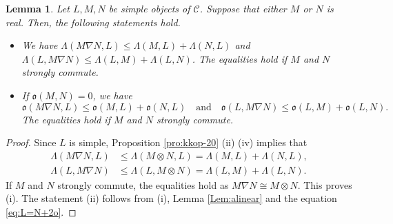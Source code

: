\documentclass[12pt]{amsart}
\newtheorem{lemma}[theorem]{Lemma}
\theoremstyle{definition}
\theoremstyle{remark}
\numberwithin{equation}{section}
\begin{document}
\begin{lemma} \label{Lem:oconv}
Let $L,M,N$ be simple objects of $\mathscr{C}$.
Suppose that either $M$ or $N$ is real. Then, the following statements hold.
\begin{itemize}
    \item [(i)] We have $ \Lambda(M \nabla N, L) \leq  \Lambda(M,L) + \Lambda(N,L)$ and $ \Lambda(L,M\nabla N)\leq   
    \Lambda(L,M) + \Lambda(L,N)$. The equalities hold if $M$ and $N$ strongly commute.
    \item[(ii)] If $\mathfrak{o}(M,N)=0$, we have
\[ \mathfrak{o}(M \nabla N, L) \le \mathfrak{o}(M,L) + \mathfrak{o}(N,L)\quad\text{and}\quad
\mathfrak{o}(L,M\nabla N) \le \mathfrak{o}(L,M) + \mathfrak{o}(L,N).\]
The equalities hold if $M$ and $N$ strongly commute. 
\end{itemize}
\end{lemma}
\begin{proof}
Since $L$ is simple, Proposition \ref{pro:kkop-20} (ii) (iv) implies that 
\begin{align}
    \Lambda(M \nabla N, L) &\leq \Lambda(M \otimes N, L)=  \Lambda(M,L) + \Lambda(N,L),\nonumber\\
    \Lambda(L,M\nabla N)&\leq   \Lambda(L,M\otimes N) =
    \Lambda(L,M) + \Lambda(L,N).\nonumber
\end{align}
If $M$ and $N$ strongly commute, the equalities hold as $M\nabla N\cong M\otimes N$. This proves (i). 
   The statement  (ii) follows from (i), Lemma \ref{Lem:alinear} and the equation \eqref{eq:L=N+2o}.
\end{proof}
\end{document}
